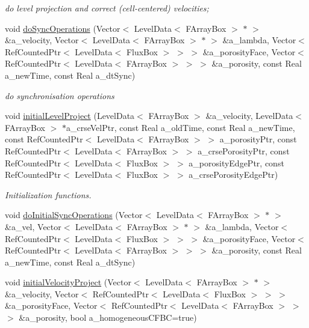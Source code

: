 \begin{DoxyCompactItemize}
\begin{DoxyCompactList}\small\item\em do level projection and correct (cell-\/centered) velocities; \end{DoxyCompactList}\item 
void \hyperlink{class_c_c_projector_a417b66addbb26b54260c42103d00b215}{do\-Sync\-Operations} (Vector$<$ Level\-Data$<$ F\-Array\-Box $>$ $\ast$ $>$ \&a\-\_\-velocity, Vector$<$ Level\-Data$<$ F\-Array\-Box $>$ $\ast$ $>$ \&a\-\_\-lambda, Vector$<$ Ref\-Counted\-Ptr$<$ Level\-Data$<$ Flux\-Box $>$ $>$ $>$ \&a\-\_\-porosity\-Face, Vector$<$ Ref\-Counted\-Ptr$<$ Level\-Data$<$ F\-Array\-Box $>$ $>$ $>$ \&a\-\_\-porosity, const Real a\-\_\-new\-Time, const Real a\-\_\-dt\-Sync)
\begin{DoxyCompactList}\small\item\em do synchronisation operations \end{DoxyCompactList}\item 
void \hyperlink{class_c_c_projector_a0eea395df93dbbe9511b8125d42225fc}{initial\-Level\-Project} (Level\-Data$<$ F\-Array\-Box $>$ \&a\-\_\-velocity, Level\-Data$<$ F\-Array\-Box $>$ $\ast$a\-\_\-crse\-Vel\-Ptr, const Real a\-\_\-old\-Time, const Real a\-\_\-new\-Time, const Ref\-Counted\-Ptr$<$ Level\-Data$<$ F\-Array\-Box $>$ $>$ a\-\_\-porosity\-Ptr, const Ref\-Counted\-Ptr$<$ Level\-Data$<$ F\-Array\-Box $>$ $>$ a\-\_\-crse\-Porosity\-Ptr, const Ref\-Counted\-Ptr$<$ Level\-Data$<$ Flux\-Box $>$ $>$ a\-\_\-porosity\-Edge\-Ptr, const Ref\-Counted\-Ptr$<$ Level\-Data$<$ Flux\-Box $>$ $>$ a\-\_\-crse\-Porosity\-Edge\-Ptr)
\begin{DoxyCompactList}\small\item\em Initialization functions. \end{DoxyCompactList}\item 
void \hyperlink{class_c_c_projector_ad247c3066a024e02753e3b87f69f0fad}{do\-Initial\-Sync\-Operations} (Vector$<$ Level\-Data$<$ F\-Array\-Box $>$ $\ast$ $>$ \&a\-\_\-vel, Vector$<$ Level\-Data$<$ F\-Array\-Box $>$ $\ast$ $>$ \&a\-\_\-lambda, Vector$<$ Ref\-Counted\-Ptr$<$ Level\-Data$<$ Flux\-Box $>$ $>$ $>$ \&a\-\_\-porosity\-Face, Vector$<$ Ref\-Counted\-Ptr$<$ Level\-Data$<$ F\-Array\-Box $>$ $>$ $>$ \&a\-\_\-porosity, const Real a\-\_\-new\-Time, const Real a\-\_\-dt\-Sync)
\item 
void \hyperlink{class_c_c_projector_a5be1b25977418d8d2fd9fe7b96d9dfa7}{initial\-Velocity\-Project} (Vector$<$ Level\-Data$<$ F\-Array\-Box $>$ $\ast$ $>$ \&a\-\_\-velocity, Vector$<$ Ref\-Counted\-Ptr$<$ Level\-Data$<$ Flux\-Box $>$ $>$ $>$ \&a\-\_\-porosity\-Face, Vector$<$ Ref\-Counted\-Ptr$<$ Level\-Data$<$ F\-Array\-Box $>$ $>$ $>$ \&a\-\_\-porosity, bool a\-\_\-homogeneous\-C\-F\-B\-C=true)

\end{DoxyCompactItemize}
